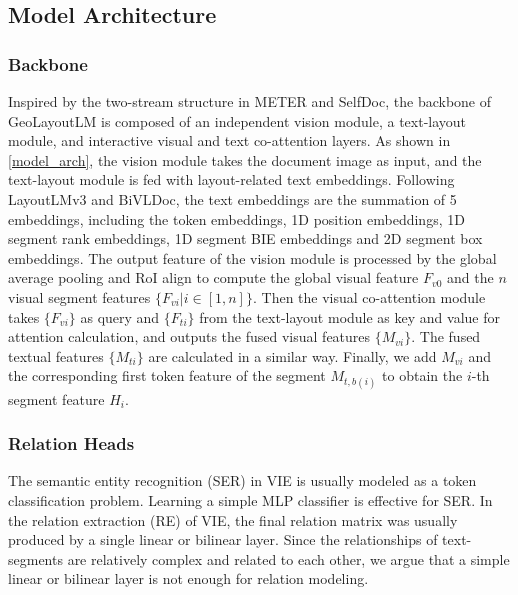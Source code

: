 \documentclass[10pt,twocolumn,letterpaper]{article}
\begin{document}
\subsection{Model Architecture}


\subsubsection{Backbone}
\label{backbone_detail}

Inspired by the two-stream structure in METER\cite{dou2022empirical} and SelfDoc\cite{li2021selfdoc}, the backbone of GeoLayoutLM is composed of an independent vision module, a text-layout module, and interactive visual and text co-attention layers. As shown in \cref{model_arch}, the vision module takes the document image as input, and the text-layout module is fed with layout-related text embeddings.
Following LayoutLMv3\cite{huang2022layoutlmv3} and BiVLDoc\cite{luo2022bivldoc}, the text embeddings are the summation of 5 embeddings, including the token embeddings, 1D position embeddings, 1D segment rank embeddings, 1D segment BIE embeddings and 2D segment box embeddings.
The output feature of the vision module is processed by the global average pooling\cite{lin2013network} and RoI align\cite{he2017mask} to compute the global visual feature $F_{v0}$ and the $n$ visual segment features $\{F_{vi}|i\in [1,n]\}$.
Then the visual co-attention module takes $\{F_{vi}\}$ as query and $\{F_{ti}\}$ from the text-layout module as key and value for attention calculation, and outputs the fused visual features $\{M_{vi}\}$.
The fused textual features $\{M_{ti}\}$ are calculated in a similar way.
Finally, we add $M_{vi}$ and the corresponding first token feature of the segment $M_{t,b(i)}$ to obtain the $i$-th segment feature $H_i$.







\subsubsection{Relation Heads}


The semantic entity recognition (SER) in VIE is usually modeled as a token classification problem.
Learning a simple MLP classifier is effective for SER\cite{huang2022layoutlmv3}.
In the relation extraction (RE) of VIE, the final relation matrix was usually produced by a single linear or bilinear layer\cite{li2021structext,hong2022bros}.
Since the relationships of text-segments are relatively complex and related to each other, we argue that a simple linear or bilinear layer is not enough for relation modeling.
\end{document}
